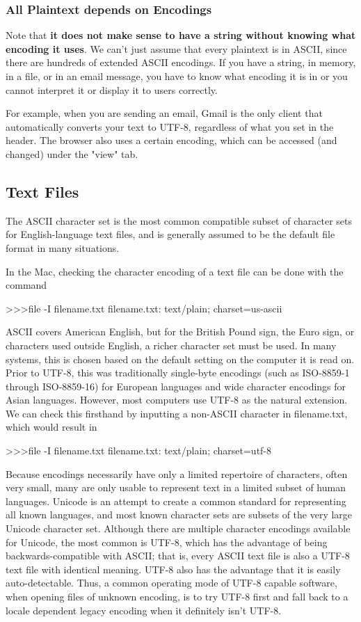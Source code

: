 \documentclass[a4paper, 12pt]{report}
\theoremstyle{remark}
\theoremstyle{definition}
\begin{document}
\subsubsection{All Plaintext depends on Encodings}
Note that \textbf{it does not make sense to have a string without knowing what encoding it uses}. We can't just assume that every plaintext is in ASCII, since there are hundreds of extended ASCII encodings. If you have a string, in memory, in a file, or in an email message, you have to know what encoding it is in or you cannot interpret it or display it to users correctly. 

For example, when you are sending an email, Gmail is the only client that automatically converts your text to UTF-8, regardless of what you set in the header. The browser also uses a certain encoding, which can be accessed (and changed) under the "view" tab. 

\subsection{Text Files}
The ASCII character set is the most common compatible subset of character sets for English-language text files, and is generally assumed to be the default file format in many situations. 

In the Mac, checking the character encoding of a text file can be done with the command 
\begin{python}
>>>file -I filename.txt
filename.txt: text/plain; charset=us-ascii
\end{python}
ASCII covers American English, but for the British Pound sign, the Euro sign, or characters used outside English, a richer character set must be used. In many systems, this is chosen based on the default setting on the computer it is read on. Prior to UTF-8, this was traditionally single-byte encodings (such as ISO-8859-1 through ISO-8859-16) for European languages and wide character encodings for Asian languages. However, most computers use UTF-8 as the natural extension. We can check this firsthand by inputting a non-ASCII character in filename.txt, which would result in
\begin{python}
>>>file -I filename.txt
filename.txt: text/plain; charset=utf-8
\end{python}
Because encodings necessarily have only a limited repertoire of characters, often very small, many are only usable to represent text in a limited subset of human languages. Unicode is an attempt to create a common standard for representing all known languages, and most known character sets are subsets of the very large Unicode character set. Although there are multiple character encodings available for Unicode, the most common is UTF-8, which has the advantage of being backwards-compatible with ASCII; that is, every ASCII text file is also a UTF-8 text file with identical meaning. UTF-8 also has the advantage that it is easily auto-detectable. Thus, a common operating mode of UTF-8 capable software, when opening files of unknown encoding, is to try UTF-8 first and fall back to a locale dependent legacy encoding when it definitely isn't UTF-8.
\end{document}
